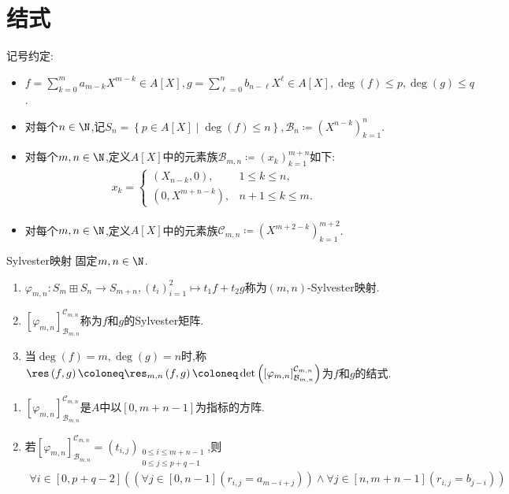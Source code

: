 \section{结式}

记号约定:
\begin{itemize}
	\item $f=\sum\limits_{k=0}^{m}a_{m-k}X^{m-k}\in A[X],g=\sum\limits_{\ell=0}^{n}b_{n-\ell}X^{\ell}\in A[X],\deg\left(f\right)\leq p,\deg\left(g\right)\leq q$.
	\item 对每个$n\in\N$,记$S_{n}=\left\{p\in A[X]\middle|\deg\left(f\right)\leq n\right\},\mathcal{B}_{n}\coloneq\left(X^{n-k}\right)_{k=1}^{n}$.
	\item 对每个$m,n\in\N$,定义$A[X]$中的元素族$\mathcal{B}_{m,n}\coloneq\left(x_{k}\right)_{k=1}^{m+n}$如下:
	\begin{align*}
		x_{k}=
		\begin{cases}
			\left(X_{n-k},0\right),&1\leq k\leq n,\\
			\left(0,X^{m+n-k}\right),&n+1\leq k\leq m.
		\end{cases}
	\end{align*}
	\item 对每个$m,n\in\N$,定义$A[X]$中的元素族$\mathcal{C}_{m,n}\coloneq\left(X^{m+2-k}\right)_{k=1}^{m+2}$.
\end{itemize}

\begin{definition}{Sylvester映射}{}
	固定$m,n\in\N$.
	\begin{enumerate}
		\item $\varphi_{m,n}:S_{m}\boxplus S_{n}\to S_{m+n},\left(t_{i}\right)_{i=1}^{2}\mapsto t_{1}f+t_{2}g$称为$\left(m,n\right)$-Sylvester映射.
		\item $\left[\varphi_{m,n}\right]_{\mathcal{B}_{m,n}}^{\mathcal{C}_{m,n}}$称为$f$和$g$的Sylvester矩阵.
		\item 当$\deg\left(f\right)=m,\deg\left(g\right)=n$时,称$\res\left(f,g\right)\coloneq\res_{m,n}\left(f,g\right)\coloneq\det\left(\left[\varphi_{m,n}\right]_{\mathcal{B}_{m,n}}^{\mathcal{C}_{m,n}}\right)$为$f$和$g$的结式.
	\end{enumerate}
\end{definition}

\begin{remark}{}{}
	\begin{enumerate}
		\item $\left[\varphi_{m,n}\right]_{\mathcal{B}_{m,n}}^{\mathcal{C}_{m,n}}$是$A$中以$\left[0,m+n-1\right]$为指标的方阵.
		\item 若$\left[\varphi_{m,n}\right]_{\mathcal{B}_{m,n}}^{\mathcal{C}_{m,n}}=\left(t_{i,j}\right)_{\substack{0\leq i\leq m+n-1\\ 0\leq j\leq p+q-1}}$,则
		\begin{align*}
			\forall i\in\left[0,p+q-2\right]\left(\left(\forall j\in\left[0,n-1\right]\left(r_{i,j}=a_{m-i+j}\right)\right)\wedge\forall j\in\left[n,m+n-1\right]\left(r_{i,j}=b_{j-i}\right)\right)
		\end{align*}
	\end{enumerate}
\end{remark}

